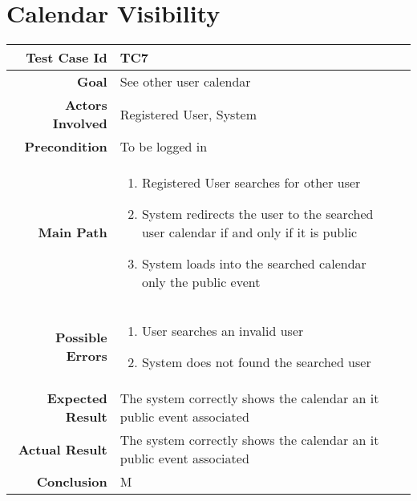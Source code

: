 \section{Calendar Visibility}
\begin{tabularx}{\linewidth}{|r|X|X|}
\hline   {\bf Test Case Id} &  TC7\\
  \hline  {\bf Goal} & See other user calendar\\
  \hline  {\bf Actors Involved} & Registered User, System\\
  \hline  {\bf Precondition} & To be logged in\\ 
   \hline  {\bf Main Path} & \begin{enumerate} 
   \item Registered User searches for other user
    \item System redirects the user to the searched user calendar if and only if it is public
    \item System loads into the searched calendar only the public event
   \end{enumerate}\\
   \hline  {\bf Possible Errors} & \begin{enumerate} 
   \item User searches an invalid user
   \item System does not found the searched user
   \end{enumerate}\\
  \hline  {\bf Expected Result} & The system correctly shows the calendar an it public event associated\\
  \hline  {\bf Actual Result} & The system correctly shows the calendar an it public event associated\\
  \hline  {\bf Conclusion} & M\\
  \hline
  
\end{tabularx}

